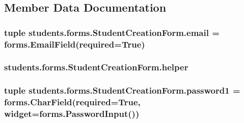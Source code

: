 \subsection{Member Data Documentation}
\hypertarget{classstudents_1_1forms_1_1_student_creation_form_a6a1bb012c88fcfa09027ca6e951a7ae3}{
\subsubsection[{email}]{\setlength{\rightskip}{0pt plus 5cm}tuple students.\-forms.\-Student\-Creation\-Form.\-email = forms.\-Email\-Field(required=True)\hspace{0.3cm}{\ttfamily [static]}}}\label{classstudents_1_1forms_1_1_student_creation_form_a6a1bb012c88fcfa09027ca6e951a7ae3}
\hypertarget{classstudents_1_1forms_1_1_student_creation_form_ae1155eb425b3d6d3367af8f8f09dc239}{
\subsubsection[{helper}]{\setlength{\rightskip}{0pt plus 5cm}students.\-forms.\-Student\-Creation\-Form.\-helper}}\label{classstudents_1_1forms_1_1_student_creation_form_ae1155eb425b3d6d3367af8f8f09dc239}
\hypertarget{classstudents_1_1forms_1_1_student_creation_form_a5386136d5fa960ed2b47baaeedfa4e7d}{
\subsubsection[{password1}]{\setlength{\rightskip}{0pt plus 5cm}tuple students.\-forms.\-Student\-Creation\-Form.\-password1 = forms.\-Char\-Field(required=True, widget=forms.\-Password\-Input())\hspace{0.3cm}{\ttfamily [static]}}}\label{classstudents_1_1forms_1_1_student_creation_form_a5386136d5fa960ed2b47baaeedfa4e7d}

